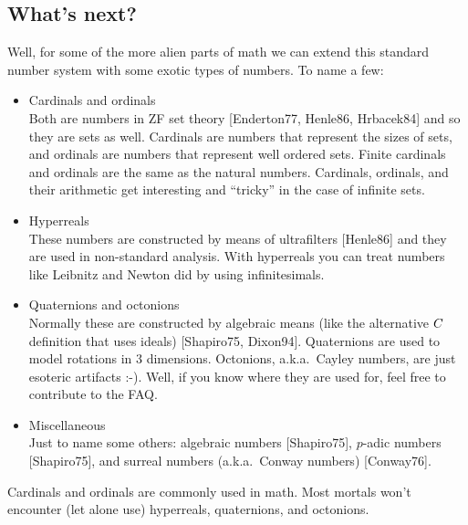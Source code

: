 \subsection{What's next?}

Well, for some of the more alien parts of math we can extend this standard
number system with some exotic types of numbers. To name a few:
\begin{itemize}
\item Cardinals and ordinals \\
      Both are numbers in ZF set theory [Enderton77, Henle86, Hrbacek84] and
      so they are sets as well. Cardinals are numbers that represent the
      sizes of sets, and ordinals are numbers that represent well ordered
      sets. Finite cardinals and ordinals are the same as the natural
      numbers. Cardinals, ordinals, and their arithmetic get interesting and
      ``tricky'' in the case of infinite sets.
\item Hyperreals \\
      These numbers are constructed by means of ultrafilters [Henle86] and
      they are used in non-standard analysis. With hyperreals you can treat
      numbers like Leibnitz and Newton did by using infinitesimals.
\item Quaternions and octonions \\
      Normally these are constructed by algebraic means (like the alternative
      $C$ definition that uses ideals) [Shapiro75, Dixon94]. Quaternions are
      used to model rotations in 3 dimensions. Octonions, a.k.a.\ Cayley
      numbers, are just esoteric artifacts :-). Well, if you know where they
      are used for, feel free to contribute to the FAQ.
\item Miscellaneous \\
      Just to name some others: algebraic numbers [Shapiro75], $p$-adic
      numbers [Shapiro75], and surreal numbers (a.k.a.\ Conway
      numbers) [Conway76].
\end{itemize}
Cardinals and ordinals are commonly used in math. Most mortals won't
encounter (let alone use) hyperreals, quaternions, and octonions.

